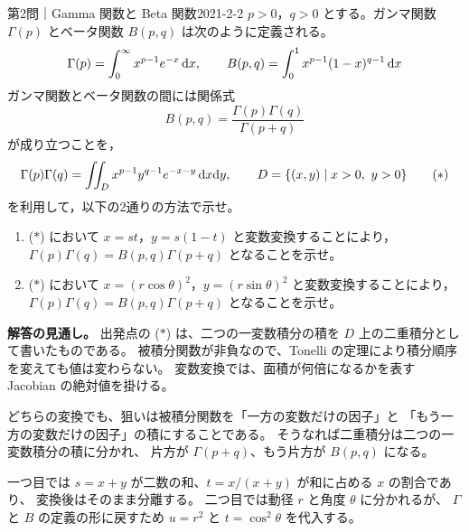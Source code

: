 \begin{problem}{第2問｜Gamma 関数と Beta 関数}{2021-2-2}
$p>0$，$q>0$ とする。ガンマ関数 $\Gamma(p)$ とベータ関数 $B(p,q)$ は次のように定義される。
\[
\Gamma(p)=\int_0^\infty x^{p-1}e^{-x}\,\mathrm{d} x,
\qquad B(p,q)=\int_0^1x^{p-1}(1-x)^{q-1}\,\mathrm{d} x
\]
ガンマ関数とベータ関数の間には関係式
\[
B(p,q)=\frac{\Gamma(p)\Gamma(q)}{\Gamma(p+q)}
\]
が成り立つことを，
\[
\Gamma(p)\Gamma(q)=\iint_Dx^{p-1}y^{q-1}e^{-x-y}\,\mathrm{d} x\mathrm{d} y,
\qquad D=\{(x,y)\mid x>0,\ y>0\}
\tag{$*$}
\]
を利用して，以下の2通りの方法で示せ。
\begin{enumerate}
  \item[(1)] ($*$) において $x=st$，$y=s(1-t)$ と変数変換することにより，$\Gamma(p)\Gamma(q)=B(p,q)\Gamma(p+q)$ となることを示せ。
  \item[(2)] ($*$) において $x=(r\cos\theta)^2$，$y=(r\sin\theta)^2$ と変数変換することにより，$\Gamma(p)\Gamma(q)=B(p,q)\Gamma(p+q)$ となることを示せ。
\end{enumerate}
\end{problem}
\begin{memo*}
\textbf{解答の見通し。}
出発点の ($*$) は、二つの一変数積分の積を $D$ 上の二重積分として書いたものである。
被積分関数が非負なので、Tonelli の定理により積分順序を変えても値は変わらない。
変数変換では、面積が何倍になるかを表す Jacobian の絶対値を掛ける。

どちらの変換でも、狙いは被積分関数を「一方の変数だけの因子」と
「もう一方の変数だけの因子」の積にすることである。
そうなれば二重積分は二つの一変数積分の積に分かれ、
片方が $\Gamma(p+q)$、もう片方が $B(p,q)$ になる。

一つ目では $s=x+y$ が二数の和、$t=x/(x+y)$ が和に占める $x$ の割合であり、
変換後はそのまま分離する。
二つ目では動径 $r$ と角度 $\theta$ に分かれるが、
$\Gamma$ と $B$ の定義の形に戻すため $u=r^2$ と $t=\cos^2\theta$ を代入する。
\end{memo*}
